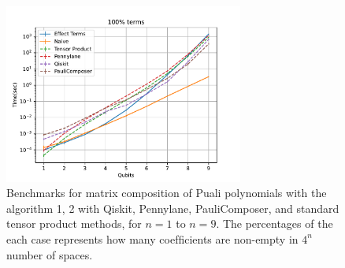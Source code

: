 \begin{figure}
    \centering
    \includegraphics[width=0.7\textwidth]{media/1_terms.pdf}
    \caption{Benchmarks for matrix composition of Puali polynomials with the algorithm 1, 2 with Qiskit, Pennylane,
    PauliComposer, and standard tensor product methods, for $n = 1$ to $n = 9$. The percentages of the each case represents
    how many coefﬁcients are non-empty in $4^n$ number of spaces.}
    \label{fig:composition_benchmark}
\end{figure}